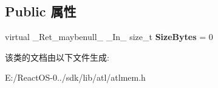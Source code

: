 \subsection*{Public 属性}
\begin{DoxyCompactItemize}
\item 
\mbox{\label{class_a_t_l_1_1_i_atl_mem_mgr_aa3d1eee341397827efbfc8ff9694d84c}} 
virtual \+\_\+\+Ret\+\_\+maybenull\+\_\+ \+\_\+\+In\+\_\+ size\+\_\+t {\bfseries Size\+Bytes} = 0
\end{DoxyCompactItemize}


该类的文档由以下文件生成\+:\begin{DoxyCompactItemize}
\item 
E\+:/\+React\+O\+S-\/0../sdk/lib/atl/atlmem.\+h\end{DoxyCompactItemize}
